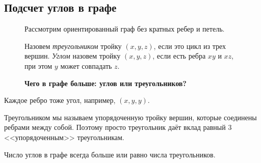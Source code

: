 \subsection{Подсчет углов в графе}
\begin{figure}[h]
	\begin{minipage}{0.7\textwidth}
Рассмотрим ориентированный граф без кратных ребер и петель.

Назовем \textit{треугольником} тройку $ (x, y, z)$, если это цикл из трех вершин. \textit{Углом} назовем тройку  $ (x, y, z)$, если есть ребра  $ xy$ и $xz$, при этом  $ y $ может совпадать  $ z$.

\textbf{Чего в графе больше: углов или треугольников?}
	\end{minipage}
	\begin{minipage}{0.25\textwidth}
	\end{minipage}
\end{figure}
\begin{note}
	Каждое ребро тоже угол, например, $ (x, y, y)$.
\end{note}
\begin{note}
    Треугольником мы называем упорядоченную тройку вершин, которые соединены ребрами между собой. Поэтому просто треугольник даёт вклад равный 3 <<упорядоченным>> треугольникам.
\end{note}
\begin{thm}
    Число углов в графе всегда больше или равно числа треугольников.
\end{thm}
